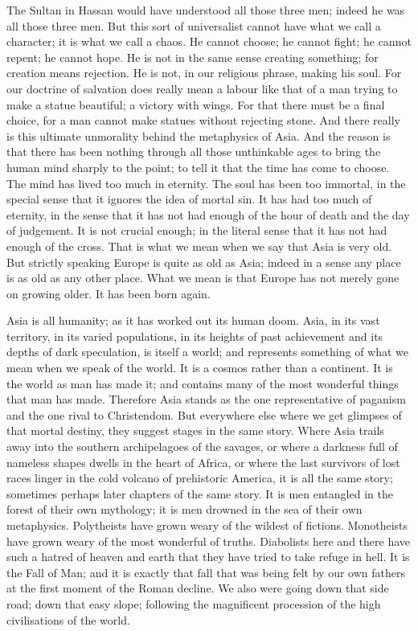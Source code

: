 The Sultan in Hassan would have understood all those three men; indeed he was all those three men. But this sort of universalist cannot have what we call a character; it is what we call a chaos. He cannot choose; he cannot fight; he cannot repent; he cannot hope. He is not in the same sense creating something; for creation means rejection. He is not, in our religious phrase, making his soul. For our doctrine of salvation does really mean a labour like that of a man trying to make a statue beautiful; a victory with wings. For that there must be a final choice, for a man cannot make statues without rejecting stone. And there really is this ultimate unmorality behind the metaphysics of Asia. And the reason is that there has been nothing through all those unthinkable ages to bring the human mind sharply to the point; to tell it that the time has come to choose. The mind has lived too much in eternity. The soul has been too immortal, in the special sense that it ignores the idea of mortal sin. It has had too much of eternity, in the sense that it has not had enough of the hour of death and the day of judgement. It is not crucial enough; in the literal sense that it has not had enough of the cross. That is what we mean when we say that Asia is very old. But strictly speaking Europe is quite as old as Asia; indeed in a sense any place is as old as any other place. What we mean is that Europe has not merely gone on growing older. It has been born again.

Asia is all humanity; as it has worked out its human doom. Asia, in its vast territory, in its varied populations, in its heights of past achievement and its depths of dark speculation, is itself a world; and represents something of what we mean when we speak of the world. It is a cosmos rather than a continent. It is the world as man has made it; and contains many of the most wonderful things that man has made. Therefore Asia stands as the one representative of paganism and the one rival to Christendom. But everywhere else where we get glimpses of that mortal destiny, they suggest stages in the same story. Where Asia trails away into the southern archipelagoes of the savages, or where a darkness full of nameless shapes dwells in the heart of Africa, or where the last survivors of lost races linger in the cold volcano of prehistoric America, it is all the same story; sometimes perhaps later chapters of the same story. It is men entangled in the forest of their own mythology; it is men drowned in the sea of their own metaphysics. Polytheists have grown weary of the wildest of fictions. Monotheists have grown weary of the most wonderful of truths. Diabolists here and there have such a hatred of heaven and earth that they have tried to take refuge in hell. It is the Fall of Man; and it is exactly that fall that was being felt by our own fathers at the first moment of the Roman decline. We also were going down that side road; down that easy slope; following the magnificent procession of the high civilisations of the world.

